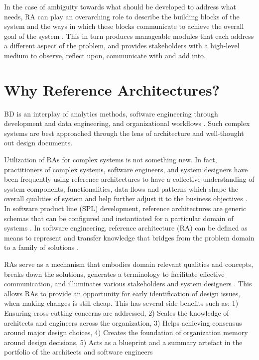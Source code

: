 \documentclass[10pt, conference]{IEEEtran}
\begin{document}
In the case of ambiguity towards what should be developed to address what needs, RA can play an overarching role to describe the building blocks of the system and the ways in which these blocks communicate to achieve the overall goal of the system \cite{Sievi-Korte}. This in turn produces manageable modules that each address a different aspect of the problem, and provides stakeholders with a high-level medium to observe, reflect upon, communicate with and add into.


\section{Why Reference Architectures?}

BD is an interplay of analytics methods, software engineering through development and data engineering, and organizational workflows \cite{Mannering,Selamat}. Such complex systems are best approached through the lens of architecture and well-thought out design documents.

Utilization of RAs for complex systems is not something new. In fact, practitioners of complex systems, software engineers, and system designers have been frequently using reference architectures to have a collective understanding of system components, functionalities, data-flows and patterns which shape the overall qualities of system and help further adjust it to the business objectives \cite{Kohler,Cloutier}. In software product line (SPL) development, reference architectures are generic schemas that can be configured and instantiated for a particular domain of systems \cite{Derras}. In software engineering, reference architecture (RA) can be defined as means to represent and transfer knowledge that bridges from the problem domain to a family of solutions \cite{Klein}.

RAs serve as a mechanism that embodies domain relevant qualities and concepts, breaks down the solutions, generates a terminology to facilitate effective communication, and illuminates various stakeholders and system designers \cite{Klein}. This allows RAs to provide an opportunity for early identification of design issues, when making changes is still cheap. This has several side-benefits such as: 1) Ensuring cross-cutting concerns are addressed, 2) Scales the knowledge of architects and engineers across the organization, 3) Helps achieving consensus around major design choices, 4) Creates the foundation of organization memory around design decisions, 5) Acts as a blueprint and a summary artefact in the portfolio of the architects and software engineers
\end{document}
